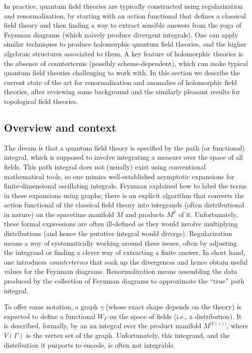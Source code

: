\documentclass[11pt]{amsart}
\begin{document}
In practice, quantum field theories are typically constructed using regularization and renormalization,
by starting with an action functional that defines a classical field theory and then finding a way to extract sensible answers from the yoga of Feynman diagrams (which naively produce divergent integrals).
One can apply similar techniques to produce holomorphic quantum field theories, and the higher algebraic structures associated to them.
A key feature of holomorphic theories is the absence of counterterms (possibly scheme-dependent), 
which can make typical quantum field theories challenging to work with.
In this section we describe the current state of the art for renormalization and anomalies of holomorphic field theories,
after reviewing some background and the similarly pleasant results for topological field theories.

\subsection{Overview and context}

The dream is that a quantum field theory is specified by the path (or functional) integral,
which is supposed to involve integrating a measure over the space of all fields.
This path integral does not (usually) exist using conventional mathematical tools,
so one mimics well-established asymptotic expansions for finite-dimensional oscillating integrals.
Feynman explained how to label the terms in these expansions using graphs;
there is an explicit algorithm that converts the action functional of the classical field theory into integrands (often distributional in nature) on the spacetime manifold $M$ and products $M^k$ of it.
Unfortunately, these formal expressions are often ill-defined as they would involve multiplying distributions (and hence the putative integral would diverge).
Regularization means a way of systematically working around these issues,
often by adjusting the integrand or finding a clever way of extracting a finite answer.
In short hand, one introduces {\it counterterms} that soak up the divergences and hence obtain useful values for the Feynman diagrams.
Renormalization means assembling the data produced by the collection of Feynman diagrams to approximate the ``true'' path integral.

To offer some notation, a graph $\gamma$ (whose exact shape depends on the theory) is expected to define a functional $W_\Gamma$ on the space of fields (i.e., a distribution).
It is described, formally, by an an integral over the product manifold $M^{|V(\gamma)|}$,  
where $V(\Gamma)$ is the vertex set of the graph.
Unfortunately, this integrand, and the distribution it purports to encode, is often not integrable.
\end{document}
